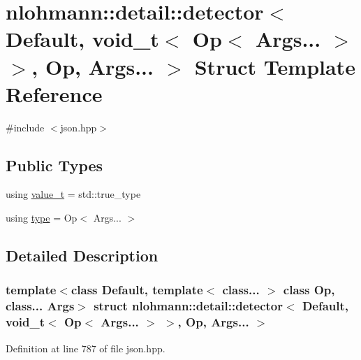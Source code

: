 \hypertarget{structnlohmann_1_1detail_1_1detector_3_01_default_00_01void__t_3_01_op_3_01_args_8_8_8_01_4_01_4_00_01_op_00_01_args_8_8_8_01_4}{}\section{nlohmann\+::detail\+::detector$<$ Default, void\+\_\+t$<$ Op$<$ Args... $>$ $>$, Op, Args... $>$ Struct Template Reference}
\label{structnlohmann_1_1detail_1_1detector_3_01_default_00_01void__t_3_01_op_3_01_args_8_8_8_01_4_01_4_00_01_op_00_01_args_8_8_8_01_4}


{\ttfamily \#include $<$json.\+hpp$>$}

\subsection*{Public Types}
\begin{DoxyCompactItemize}
\item 
using \mbox{\hyperlink{structnlohmann_1_1detail_1_1detector_3_01_default_00_01void__t_3_01_op_3_01_args_8_8_8_01_4_01_4_00_01_op_00_01_args_8_8_8_01_4_ab748f9f00bb31bee4978a033589f8c85}{value\+\_\+t}} = std\+::true\+\_\+type
\item 
using \mbox{\hyperlink{structnlohmann_1_1detail_1_1detector_3_01_default_00_01void__t_3_01_op_3_01_args_8_8_8_01_4_01_4_00_01_op_00_01_args_8_8_8_01_4_a5afd6a40e94dde21d120ac646468c495}{type}} = Op$<$ Args... $>$
\end{DoxyCompactItemize}


\subsection{Detailed Description}
\subsubsection*{template$<$class Default, template$<$ class... $>$ class Op, class... Args$>$\newline
struct nlohmann\+::detail\+::detector$<$ Default, void\+\_\+t$<$ Op$<$ Args... $>$ $>$, Op, Args... $>$}



Definition at line 787 of file json.\+hpp.




